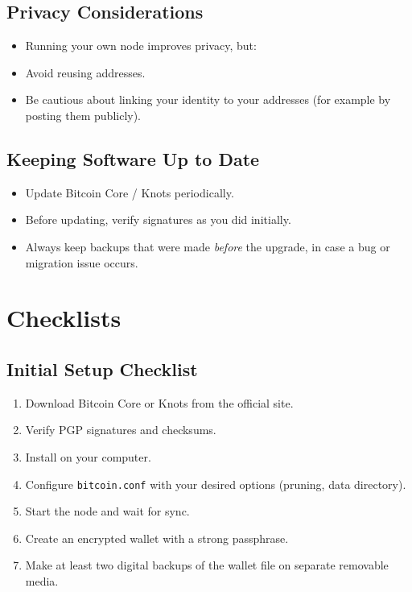\documentclass[12pt,a4paper]{book}
\begin{document}
\section{Privacy Considerations}

\begin{itemize}
  \item Running your own node improves privacy, but:
  \item Avoid reusing addresses.
  \item Be cautious about linking your identity to your addresses (for example by posting them publicly).
\end{itemize}

\section{Keeping Software Up to Date}

\begin{itemize}
  \item Update Bitcoin Core / Knots periodically.
  \item Before updating, verify signatures as you did initially.
  \item Always keep backups that were made \emph{before} the upgrade, in case a bug or migration issue occurs.
\end{itemize}

\chapter{Checklists}

\section{Initial Setup Checklist}

\begin{enumerate}
  \item Download Bitcoin Core or Knots from the official site.
  \item Verify PGP signatures and checksums.
  \item Install on your computer.
  \item Configure \texttt{bitcoin.conf} with your desired options (pruning, data directory).
  \item Start the node and wait for sync.
  \item Create an encrypted wallet with a strong passphrase.
  \item Make at least two digital backups of the wallet file on separate removable media.
\end{enumerate}
\end{document}
